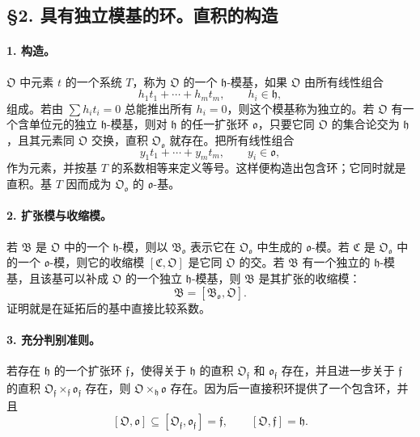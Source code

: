 \subsection*{§2. 具有独立模基的环。直积的构造}

\paragraph{1. 构造。}
\(\mathfrak O\) 中元素 \(t\) 的一个系统 \(T\)，称为 \(\mathfrak O\) 的一个 \(\mathfrak h\)-模基，如果 \(\mathfrak O\) 由所有线性组合
\[
        h_1t_1+\cdots+h_mt_m,
        \qquad h_i\in\mathfrak h,
\]
组成。若由 \(\sum h_it_i=0\) 总能推出所有 \(h_i=0\)，则这个模基称为独立的。若 \(\mathfrak O\) 有一个含单位元的独立 \(\mathfrak h\)-模基，则对 \(\mathfrak h\) 的任一扩张环 \(\mathfrak o\)，只要它同 \(\mathfrak O\) 的集合论交为 \(\mathfrak h\)，且其元素同 \(\mathfrak O\) 交换，直积 \(\mathfrak O_{\mathfrak o}\) 就存在。把所有线性组合
\[
        y_1t_1+\cdots+y_mt_m,
        \qquad y_i\in\mathfrak o,
\]
作为元素，并按基 \(T\) 的系数相等来定义等号。这样便构造出包含环；它同时就是直积。基 \(T\) 因而成为 \(\mathfrak O_{\mathfrak o}\) 的 \(\mathfrak o\)-基。

\paragraph{2. 扩张模与收缩模。}
若 \(\mathfrak B\) 是 \(\mathfrak O\) 中的一个 \(\mathfrak h\)-模，则以 \(\mathfrak B_{\mathfrak o}\) 表示它在 \(\mathfrak O_{\mathfrak o}\) 中生成的 \(\mathfrak o\)-模。若 \(\mathfrak C\) 是 \(\mathfrak O_{\mathfrak o}\) 中的一个 \(\mathfrak o\)-模，则它的收缩模 \([\mathfrak C,\mathfrak O]\) 是它同 \(\mathfrak O\) 的交。若 \(\mathfrak B\) 有一个独立的 \(\mathfrak h\)-模基，且该基可以补成 \(\mathfrak O\) 的一个独立 \(\mathfrak h\)-模基，则 \(\mathfrak B\) 是其扩张的收缩模：
\[
        \mathfrak B=[\mathfrak B_{\mathfrak o},\mathfrak O].
\]
证明就是在延拓后的基中直接比较系数。

\paragraph{3. 充分判别准则。}
若存在 \(\mathfrak h\) 的一个扩张环 \(\mathfrak f\)，使得关于 \(\mathfrak h\) 的直积 \(\mathfrak O_{\mathfrak f}\) 和 \(\mathfrak o_{\mathfrak f}\) 存在，并且进一步关于 \(\mathfrak f\) 的直积 \(\mathfrak O_{\mathfrak f}\times_{\mathfrak f}\mathfrak o_{\mathfrak f}\) 存在，则 \(\mathfrak O\times_{\mathfrak h}\mathfrak o\) 存在。因为后一直接积环提供了一个包含环，并且
\[
        [\mathfrak O,\mathfrak o]\subseteq [\mathfrak O_{\mathfrak f},\mathfrak o_{\mathfrak f}]=\mathfrak f,
        \qquad [\mathfrak O,\mathfrak f]=\mathfrak h.
\]

